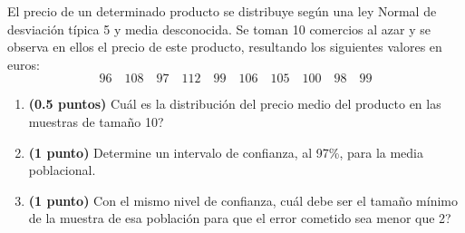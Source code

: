 
El precio de un determinado producto se distribuye según una ley Normal de desviación típica 5 \texteuro{} y media desconocida. Se toman 10 comercios al azar y se observa en ellos el precio de este producto, resultando los siguientes valores en euros:
\[
96\quad108\quad97\quad112\quad99\quad106\quad105\quad100\quad98\quad99
\]
\begin{enumerate}[label=\alph*)]
\item \textbf{(0.5 puntos)} \textquestiondown{}Cuál es la distribución del precio medio del producto en las muestras de tamaño 10?
\item \textbf{(1 punto)} Determine un intervalo de confianza, al 97\%, para la media poblacional.
\item \textbf{(1 punto)} Con el mismo nivel de confianza, \textquestiondown{}cuál debe ser el tamaño mínimo de la muestra de esa población para que el error cometido sea menor que 2?
\end{enumerate}

